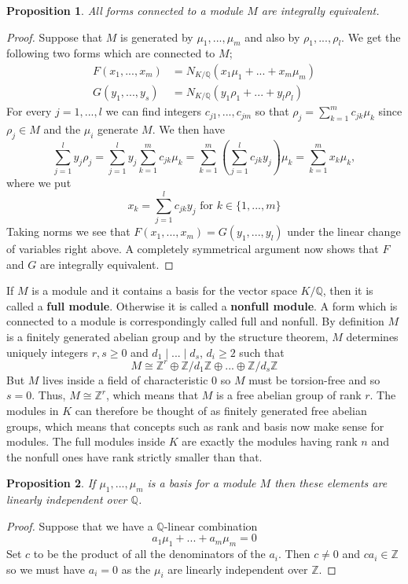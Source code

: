 \documentclass{article}
\newtheorem{proposition}{Proposition}[section]
\newcommand{\mbb}[1]{\mathbb{#1}}
\numberwithin{equation}{section}
\begin{document}
\begin{proposition}\label{fact: Forms connected to module are equivalent}
    All forms connected to a module $M$ are integrally equivalent.
\end{proposition}
\begin{proof}
    Suppose that $M$ is generated by $\mu_1, ..., \mu_m$ and also by $\rho_1, ...,\rho_l$. We get the following two forms which are connected to $M$;
    \begin{align*}
        F(x_1, ..., x_m) &= N_{K/\mbb Q}(x_1 \mu_1 + ... + x_m \mu_m) \\ G(y_1, ..., y_s) &= N_{K/\mbb Q}(y_1 \rho_1 + ... + y_l \rho_l)
    \end{align*}
    For every $j = 1, ..., l$ we can find integers $c_{j1}, ..., c_{jm}$ so that
    $\rho_j = \sum_{k=1}^m c_{jk} \mu_k$ since $\rho_j \in M$ and the $\mu_i$ generate $M$. We then have
    $$\sum_{j=1}^l y_j \rho_j = \sum_{j=1}^l y_j \sum_{k=1}^m c_{jk} \mu_k = \sum_{k=1}^m (\sum_{j=1}^l c_{jk} y_j) \mu_k = \sum_{k=1}^m x_k \mu_k,$$
    where we put 
    \begin{equation*}
        x_k = \sum_{j=1}^l c_{jk} y_j \text{ for } k \in \{1, ..., m\}
    \end{equation*}
    Taking norms we see that $F(x_1, ..., x_m) = G(y_1, ..., y_l)$ under the linear change of variables right above. A completely symmetrical argument now shows that $F$ and $G$ are integrally equivalent.
\end{proof}
If $M$ is a module and it contains a basis for the vector space $K / \mbb{Q}$, then it is called a \textbf{full module}. Otherwise it is called a \textbf{nonfull module}. A form which is connected to a module is correspondingly called full and nonfull. By definition $M$ is a finitely generated abelian group and by the structure theorem, $M$ determines uniquely integers $r,s \geq 0$ and $d_1 \mid ... \mid d_s$, $d_i \geq 2$ such that
$$M \cong \mbb{Z}^r \oplus \mbb{Z}/d_1\mbb{Z} \oplus ... \oplus \mbb{Z}/d_s\mbb{Z} $$
But $M$ lives inside a field of characteristic 0 so $M$ must be torsion-free and so $s = 0$. Thus, $M \cong \mbb{Z}^r$, which means that $M$ is a free abelian group of rank $r$. The modules in $K$ can therefore be thought of as finitely generated free abelian groups, which means that concepts such as rank and basis now make sense for modules. The full modules inside $K$ are exactly the modules having rank $n$ and the nonfull ones have rank strictly smaller than that.

\begin{proposition}\label{lem: Basis for module is linearly independent over Q}
    If $\mu_1, ..., \mu_m$ is a basis for a module $M$ then these elements are linearly independent over $\mbb Q$.
\end{proposition}
\begin{proof}
    Suppose that we have a $\mbb Q$-linear combination
    $$a_1 \mu_1 + ... + a_m \mu_m = 0$$
    Set $c$ to be the product of all the denominators of the $a_i$. Then $c \neq 0$ and $ca_i \in \mbb Z$ so we must have $a_i = 0$ as the $\mu_i$ are linearly independent over $\mbb Z$.
\end{proof}
\end{document}
